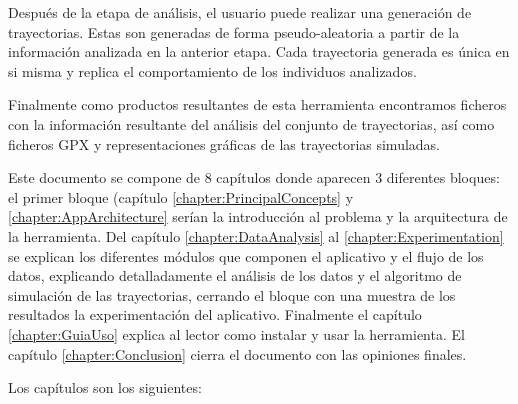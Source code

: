 Después de la etapa de análisis, el usuario puede realizar una generación de 
trayectorias. Estas son generadas de forma pseudo-aleatoria a partir de la información 
analizada en la anterior etapa. Cada trayectoria generada es única en si misma y replica 
el comportamiento de los individuos analizados.

Finalmente como productos resultantes de esta herramienta encontramos ficheros con 
la información resultante del análisis del conjunto de trayectorias, así como ficheros 
\ac{GPX} y representaciones gráficas de las trayectorias simuladas.

Este documento se compone de 8 capítulos donde aparecen 3 diferentes bloques: el 
primer bloque  (capítulo \ref{chapter:PrincipalConcepts} y 
\ref{chapter:AppArchitecture}   serían la introducción al problema y la arquitectura de la 
herramienta. Del capítulo \ref{chapter:DataAnalysis} al \ref{chapter:Experimentation} se 
explican los diferentes módulos que componen el aplicativo y el flujo de los datos, 
explicando detalladamente el análisis de los datos y el algoritmo de simulación de las 
trayectorias, cerrando el bloque con una muestra de los resultados la experimentación 
del aplicativo. Finalmente el capítulo \ref{chapter:GuiaUso} explica al lector como 
instalar y usar la herramienta. El capítulo \ref{chapter:Conclusion} cierra el documento 
con las opiniones finales.

Los capítulos son los siguientes:


